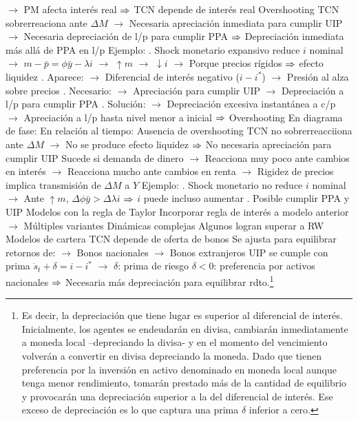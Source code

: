 \documentclass{nuevotema}
\begin{document}
\begin{esquemal}
				\4[] $\to$ PM afecta interés real
				\4[] $\Rightarrow$ TCN depende de interés real
				\4 Overshooting
				\4[] TCN sobrerreaciona ante $\Delta M$
				\4[] $\to$ Necesaria apreciación inmediata para cumplir UIP
				\4[] $\to$ Necesaria depreciación de l/p para cumplir PPA
				\4[] $\Rightarrow$ Depreciación inmediata más allá de PPA en l/p
				\4[] Ejemplo:
				. Shock monetario expansivo reduce $i$ nominal
				\4[] $\to$ $m-\bar{p} = \phi \bar{y} - \lambda i$
				\4[] $\to$ $\uparrow m$ $\to$ $\downarrow i$
				\4[] $\to$ Porque precios rígidos $\Rightarrow$ efecto liquidez
				. Aparece:
				\4[] $\to$ Diferencial de interés negativo ($i-i^*$)
				\4[] $\to$ Presión al alza sobre precios
				. Necesario:
				\4[] $\to$ Apreciación para cumplir UIP
				\4[] $\to$ Depreciación a l/p para cumplir PPA
				. Solución:
				\4[] $\to$ Depreciación excesiva instantánea a c/p
				\4[] $\to$ Apreciación a l/p hasta nivel menor a inicial
				\4[] $\Rightarrow$ Overshooting
				\4[] En diagrama de fase:
				\4[] 
				\4[] En relación al tiempo:
				\4[] 
				\4 Ausencia de overshooting
				\4[] TCN no sobrerreacciiona ante $\Delta M$
				\4[] $\to$ No se produce efecto liquidez
				\4[] $\Rightarrow$ No necesaria apreciación para cumplir UIP
				\4[] Sucede si demanda de dinero
				\4[] $\to$ Reacciona muy poco ante cambios en interés
				\4[] $\to$ Reacciona mucho ante cambios en renta
				\4[] $\to$ Rigidez de precios implica transmisión de $\Delta M$ a $Y$
				\4[] Ejemplo:
				. Shock monetario no reduce $i$ nominal
				\4[] $\to$ Ante $\uparrow m$, $\Delta \phi \bar{y} > \Delta \lambda i$
				\4[] $\Rightarrow$ $i$ puede incluso aumentar
				. Posible cumplir PPA y UIP
			\3 Modelos con la regla de Taylor
				\4 Incorporar regla de interés a modelo anterior
				\4[] $\to$ Múltiples variantes
				\4 Dinámicas complejas
				\4 Algunos logran superar a RW
			\3 Modelos de cartera
				\4 TCN depende de oferta de bonos
				\4[] Se ajusta para equilibrar retornos de:
				\4[] $\to$ Bonos nacionales
				\4[] $\to$ Bonos extranjeros
				\4 UIP se cumple con prima
				\4[] $\dot{s}_t + \delta  = i-i^*$
				\4[] $\to$ $\delta$: prima de riesgo
				\4[] $\delta < 0$: preferencia por activos nacionales
				\4[] $\Rightarrow$ Necesaria más depreciación para equilibrar rdto.\footnote{Es decir, la depreciación que tiene lugar es superior al diferencial de interés. Inicialmente, los agentes se endeudarán en divisa, cambiarán inmediatamente a moneda local --depreciando la divisa- y en el momento del vencimiento volverán a convertir en divisa depreciando la moneda. Dado que tienen preferencia por la inversión en activo denominado en moneda local aunque tenga menor rendimiento, tomarán prestado más de la cantidad de equilibrio y provocarán una depreciación superior a la del diferencial de interés. Ese exceso de depreciación es lo que captura una prima $\delta$ inferior a cero.}

\end{esquemal}
\end{document}
